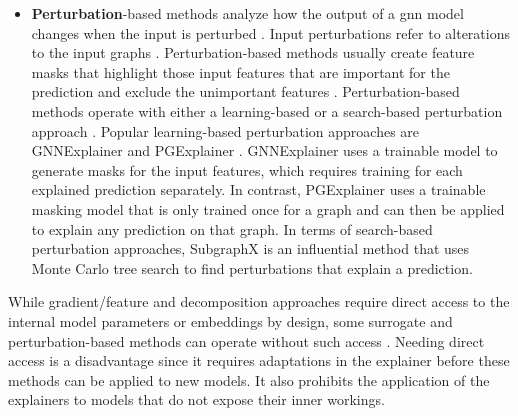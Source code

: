 \begin{itemize}
    \item \textbf{Perturbation}-based methods analyze how the output of a \gls{gnn} model changes when the input is perturbed \cite{yuan_explainability_2020}. Input perturbations refer to alterations to the input graphs \cite{yuan_explainability_2020}. Perturbation-based methods usually create feature masks that highlight those input features that are important for the prediction and exclude the unimportant features \cite{yuan_explainability_2020, ivanovs_perturbation-based_2021}. Perturbation-based methods operate with either a learning-based or a search-based perturbation approach \cite{xia_explaining_2023}. Popular learning-based perturbation approaches are GNNExplainer \cite{ying_gnnexplainer_2019} and PGExplainer \cite{luo_parameterized_2020}. GNNExplainer \cite{ying_gnnexplainer_2019} uses a trainable model to generate masks for the input features, which requires training for each explained prediction separately. In contrast, PGExplainer \cite{luo_parameterized_2020} uses a trainable masking model that is only trained once for a graph and can then be applied to explain any prediction on that graph. In terms of search-based perturbation approaches, SubgraphX \cite{yuan_explainability_2021} is an influential method that uses Monte Carlo tree search to find perturbations that explain a prediction.
\end{itemize}

\newpage

While gradient/feature and decomposition approaches require direct access to the internal model parameters or embeddings by design, some surrogate and perturbation-based methods can operate without such access \cite{kakkad_survey_2023}. Needing direct access is a disadvantage since it requires adaptations in the explainer before these methods can be applied to new models. It also prohibits the application of the explainers to models that do not expose their inner workings.

